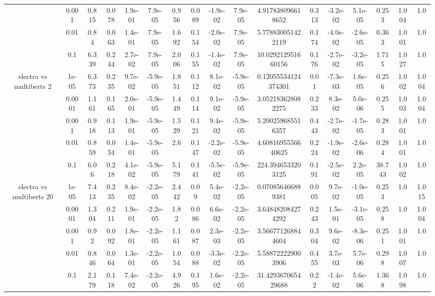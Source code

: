 \begin{tabular}{|c|c|c|c|c|c|c|c|c|c|c|c|c|c|c|c|c|}
 & 0.001 & 0.815 & 0.078 & 1.9e-01 & 7.9e-05 & 0.956 & 0.089 & -1.9e-02 & 7.9e-05 & 4.917838096618652 & 0.313 & -3.2e-02 & 5.1e-05 & 0.253 & 1.004 & 1.0 \\
 & 0.01 & 0.84 & 0.063 & 1.4e-01 & 7.9e-05 & 1.692 & 0.154 & -2.0e-02 & 7.9e-05 & 5.778830051422119 & 0.174 & -4.0e-02 & -2.6e-05 & 0.363 & 1.001 & 1.0 \\
 & 0.1 & 6.339 & 0.244 & 2.7e-02 & 7.9e-05 & 2.006 & 0.155 & -1.4e-02 & 7.9e-05 & 10.029212951660156 & 0.176 & -2.7e-02 & -3.2e-05 & 1.715 & 1.027 & 1.0 \\
\hline
\multirow{5}{*}{electra  vs multiberts 2} & 1e-05 & 6.373 & 0.235 & 9.7e-02 & -5.9e-05 & 1.851 & 0.112 & 8.1e-02 & -5.9e-05 & 0.12055534124374301 & 0.01 & -7.3e-03 & 1.6e-05 & 0.256 & 1.002 & 1.004 \\
 & 0.0001 & 1.161 & 0.165 & 2.0e-01 & -5.9e-05 & 1.449 & 0.114 & 9.1e-02 & -5.9e-05 & 3.052183628082275 & 0.233 & 8.3e-02 & 5.0e-06 & 0.255 & 1.003 & 1.004 \\
 & 0.001 & 0.918 & 0.113 & 1.9e-01 & -5.9e-05 & 1.529 & 0.121 & 9.4e-02 & -5.9e-05 & 5.200259685516357 & 0.443 & -2.7e-02 & -1.7e-05 & 0.283 & 1.001 & 1.0 \\
 & 0.01 & 0.859 & 0.054 & 1.4e-01 & -5.9e-05 & 2.6 & 0.147 & -2.2e-02 & -5.9e-05 & 4.6081695556640625 & 0.224 & -1.9e-02 & -2.6e-06 & 0.284 & 1.001 & 1.0 \\
 & 0.1 & 6.06 & 0.218 & 4.1e-02 & -5.9e-05 & 5.179 & 0.141 & -5.5e-02 & -5.9e-05 & 224.3946533203125 & 0.191 & -2.5e-02 & 2.2e-05 & 38.743 & 1.002 & 1.0 \\
\hline
\multirow{5}{*}{electra  vs multiberts 20} & 1e-05 & 7.413 & 0.235 & 8.4e-02 & -2.2e-05 & 2.442 & 0.09 & 5.4e-02 & -2.2e-05 & 0.070856466889381 & 0.005 & 9.7e-02 & -1.0e-05 & 0.253 & 1.0 & 1.015 \\
 & 0.0001 & 1.304 & 0.211 & 1.9e-01 & -2.2e-05 & 1.82 & 0.086 & 6.6e-02 & -2.2e-05 & 3.648482084274292 & 0.243 & 1.5e-01 & -3.1e-05 & 0.258 & 1.0 & 1.004 \\
 & 0.001 & 0.92 & 0.092 & 1.8e-01 & -2.2e-05 & 1.161 & 0.087 & 2.3e-03 & -2.2e-05 & 3.566771268844604 & 0.304 & 9.6e-02 & -8.3e-06 & 0.251 & 1.001 & 1.0 \\
 & 0.01 & 0.846 & 0.064 & 1.3e-01 & -2.2e-05 & 1.054 & 0.088 & -3.3e-02 & -2.2e-05 & 5.588722229003906 & 0.455 & 3.7e-03 & 5.7e-06 & 0.298 & 1.007 & 1.0 \\
 & 0.1 & 2.179 & 0.118 & 7.4e-02 & -2.2e-05 & 4.926 & 0.195 & 1.6e-02 & -2.2e-05 & 31.429367065429688 & 0.22 & -1.4e-02 & 5.6e-06 & 1.368 & 1.098 & 1.0 \\

\end{tabular}
